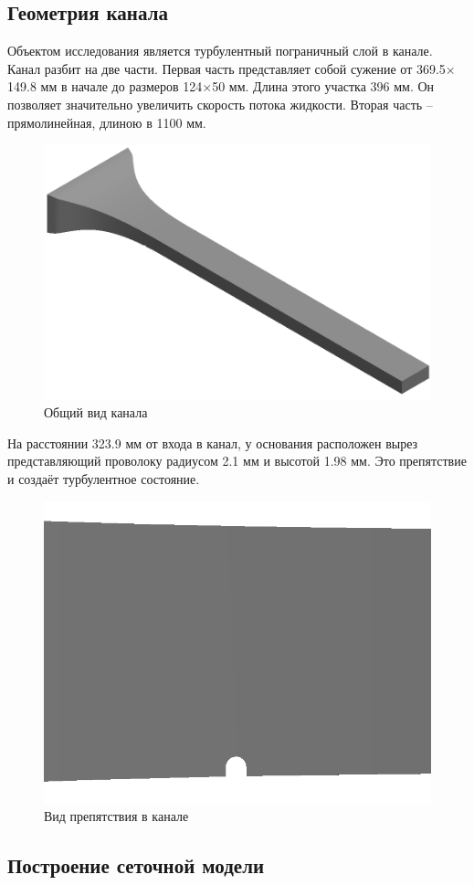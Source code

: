 \subsection{Геометрия канала}
	Объектом исследования является турбулентный пограничный слой в канале. Канал разбит на две части. Первая часть представляет собой сужение от 369.5$\times$149.8 мм в начале до размеров 124$\times$50 мм. Длина этого участка 396 мм. Он позволяет значительно увеличить скорость потока жидкости. Вторая часть -- прямолинейная, длиною в 1100 мм.
	\begin{figure}[H]
		\centering
		\includegraphics[width=0.7\linewidth]{../Assets/ВидКанала1}
		\caption{Общий вид канала}
		\label{fig:channelview}
	\end{figure}
	На расстоянии 323.9 мм от входа в канал, у основания расположен вырез представляющий проволоку радиусом 2.1 мм и высотой 1.98 мм. Это препятствие и создаёт турбулентное состояние. 
	\begin{figure}[H]
		\centering
		\includegraphics[width=0.6\linewidth]{../Assets/ВидКанала4}
		\caption{Вид препятствия в канале}
		\label{fig:vortexgeneratorview}
	\end{figure}

\subsection{Построение сеточной модели}
	
